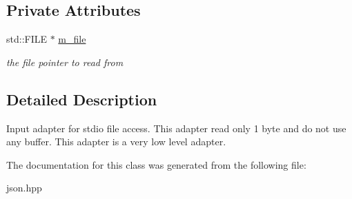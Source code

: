 \subsection*{Private Attributes}
\begin{DoxyCompactItemize}
\item 
\mbox{\label{classnlohmann_1_1detail_1_1file__input__adapter_a164fbe2739ac97e517e22bc1fff1c174}} 
std\+::\+F\+I\+LE $\ast$ \mbox{\hyperlink{classnlohmann_1_1detail_1_1file__input__adapter_a164fbe2739ac97e517e22bc1fff1c174}{m\+\_\+file}}
\begin{DoxyCompactList}\small\item\em the file pointer to read from \end{DoxyCompactList}\end{DoxyCompactItemize}


\subsection{Detailed Description}
Input adapter for stdio file access. This adapter read only 1 byte and do not use any buffer. This adapter is a very low level adapter. 

The documentation for this class was generated from the following file\+:\begin{DoxyCompactItemize}
\item 
json.\+hpp\end{DoxyCompactItemize}
